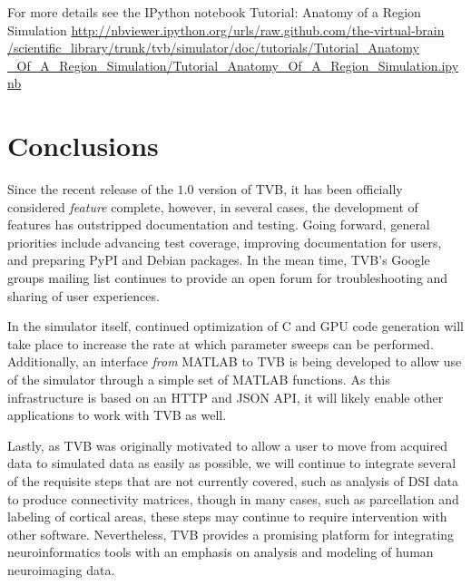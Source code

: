 \documentclass{bioinfo}
\begin{document}
For more details see the IPython notebook Tutorial: Anatomy of a Region Simulation 
\url{http://nbviewer.ipython.org/urls/raw.github.com/the-virtual-brain
/scientific_library/trunk/tvb/simulator/doc/tutorials/Tutorial_Anatomy
_Of_A_Region_Simulation/Tutorial_Anatomy_Of_A_Region_Simulation.ipynb}


%

\section{Conclusions}


Since the recent release of the $1.0$ version of TVB, it has been 
officially considered \textit{feature} complete, however, in several
cases, the development of features has outstripped documentation 
and testing. Going forward, general priorities include
advancing test coverage, improving documentation for users, and
preparing PyPI and Debian packages. In the mean
time, TVB's Google groups mailing list continues to
provide an open forum for troubleshooting and sharing of user experiences.

In the simulator itself, continued optimization of C and GPU code generation
will take place to increase the rate at which parameter sweeps can be
performed. Additionally, an interface \textit{from} MATLAB to TVB 
is being developed to allow use of the simulator through a simple
set of MATLAB functions. As this infrastructure is based on an HTTP and 
JSON API, it will likely enable other applications to work with TVB as well.

Lastly, as TVB was originally motivated to allow a user to move from
acquired data to simulated data as easily as possible, we will continue
to integrate several of the requisite steps that are not currently 
covered, such as analysis of DSI data to produce connectivity matrices,
though in many cases, such as parcellation and labeling of 
cortical areas, these steps may continue to require 
intervention with other software. Nevertheless, TVB provides a promising 
platform for integrating 
neuroinformatics tools with an emphasis on analysis and modeling of 
human neuroimaging data.

\end{document}
